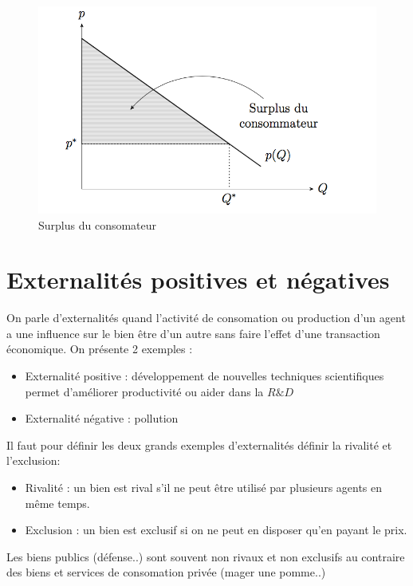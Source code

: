 \begin{figure}[h]
\begin{center}
\includegraphics[scale=0.7]{IM1}
\caption{Surplus du consomateur}
\end{center}
\end{figure}



\section{Externalités positives et négatives} %
\label{sub:externalites_positives_et_negatives}

On parle d'externalités quand l'activité de consomation ou production d'un agent a une influence sur le bien être d'un autre sans faire l'effet d'une transaction économique. On présente 2 exemples :
\begin{itemize}
	\item Externalité positive : développement de nouvelles techniques scientifiques permet d'améliorer productivité ou aider dans la $R\&D$
	\item Externalité négative : pollution
\end{itemize}

Il faut pour définir les deux grands exemples d'externalités définir la rivalité et l'exclusion: 
\begin{itemize}
	\item Rivalité : un bien est rival s'il ne peut être utilisé par plusieurs agents en même temps.
	\item Exclusion : un bien est exclusif si on ne peut en disposer qu'en payant le prix.
\end{itemize}
Les biens publics (défense..) sont souvent non rivaux et non exclusifs au contraire des biens et services de consomation privée (mager une pomme..)

